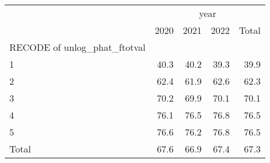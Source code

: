 \begin{tabular}{lllll}
\cline{1-5}
\multicolumn{1}{c}{} &
  \multicolumn{4}{|c}{year} \\
\multicolumn{1}{c}{} &
  \multicolumn{1}{|r}{2020} &
  \multicolumn{1}{r}{2021} &
  \multicolumn{1}{r}{2022} &
  \multicolumn{1}{r}{Total} \\
\cline{1-5}
\multicolumn{1}{l}{RECODE of unlog\_phat\_ftotval} &
  \multicolumn{1}{|r}{} &
  \multicolumn{1}{r}{} &
  \multicolumn{1}{r}{} &
  \multicolumn{1}{r}{} \\
\multicolumn{1}{l}{\hspace{1em}1} &
  \multicolumn{1}{|r}{40.3} &
  \multicolumn{1}{r}{40.2} &
  \multicolumn{1}{r}{39.3} &
  \multicolumn{1}{r}{39.9} \\
\multicolumn{1}{l}{\hspace{1em}2} &
  \multicolumn{1}{|r}{62.4} &
  \multicolumn{1}{r}{61.9} &
  \multicolumn{1}{r}{62.6} &
  \multicolumn{1}{r}{62.3} \\
\multicolumn{1}{l}{\hspace{1em}3} &
  \multicolumn{1}{|r}{70.2} &
  \multicolumn{1}{r}{69.9} &
  \multicolumn{1}{r}{70.1} &
  \multicolumn{1}{r}{70.1} \\
\multicolumn{1}{l}{\hspace{1em}4} &
  \multicolumn{1}{|r}{76.1} &
  \multicolumn{1}{r}{76.5} &
  \multicolumn{1}{r}{76.8} &
  \multicolumn{1}{r}{76.5} \\
\multicolumn{1}{l}{\hspace{1em}5} &
  \multicolumn{1}{|r}{76.6} &
  \multicolumn{1}{r}{76.2} &
  \multicolumn{1}{r}{76.8} &
  \multicolumn{1}{r}{76.5} \\
\multicolumn{1}{l}{\hspace{1em}Total} &
  \multicolumn{1}{|r}{67.6} &
  \multicolumn{1}{r}{66.9} &
  \multicolumn{1}{r}{67.4} &
  \multicolumn{1}{r}{67.3} \\
\cline{1-5}
\end{tabular}
